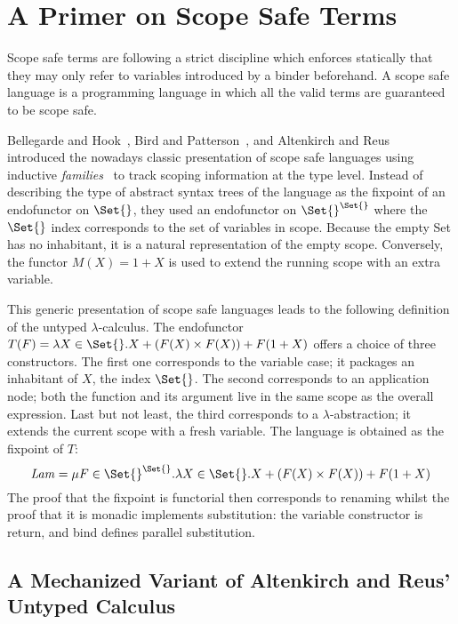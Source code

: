 \section{A Primer on Scope Safe Terms}\label{section:primer-term}

Scope safe terms are following a strict discipline which enforces statically
that they may only refer to variables introduced by a binder beforehand. A
scope safe language is a programming language in which all the valid terms
are guaranteed to be scope safe.

Bellegarde and Hook~\citeyear{BELLEGARDE1994287}, Bird and Patterson~\citeyear{bird_paterson_1999},
and Altenkirch and Reus~\citeyear{altenkirch1999monadic} introduced the
nowadays classic presentation of scope safe languages using inductive
\emph{families}~\cite{dybjer1994inductive} to track scoping information
at the type level. Instead of describing the type of abstract syntax trees
of the language as the fixpoint of an endofunctor on $\Set{}$, they used
an endofunctor on $\Set{}^{\Set{}}$ where the $\Set{}$ index corresponds
to the set of variables in scope. Because the empty Set has no inhabitant,
it is a natural representation of the empty scope. Conversely, the functor
$M(X) = 1 + X$ is used to extend the running scope with an extra variable.

This generic presentation of scope safe languages leads to the following
definition of the untyped $\lambda$-calculus. The endofunctor
$T(F) = \lambda X \in \Set{}. X + (F(X) \times F(X)) + F(1 + X)$
offers a choice of three constructors. The first one corresponds to the variable
case; it packages an inhabitant of $X$, the index $\Set{}$. The second corresponds
to an application node; both the function and its argument live in the same
scope as the overall expression. Last but not least, the third corresponds to
a $\lambda$-abstraction; it extends the current scope with a fresh variable.
The language is obtained as the fixpoint of $T$:
\[
   \mathit{Lam} = \mu F \in \Set{}^{\Set{}}.
   \lambda X \in \Set{}. X + (F(X) \times F(X)) + F(1 + X)
\]
The proof that the fixpoint is functorial then corresponds to renaming
whilst the proof that it is monadic implements substitution: the variable
constructor is return, and bind defines parallel substitution.

\subsection{A Mechanized Variant of Altenkirch and Reus' Untyped Calculus}

